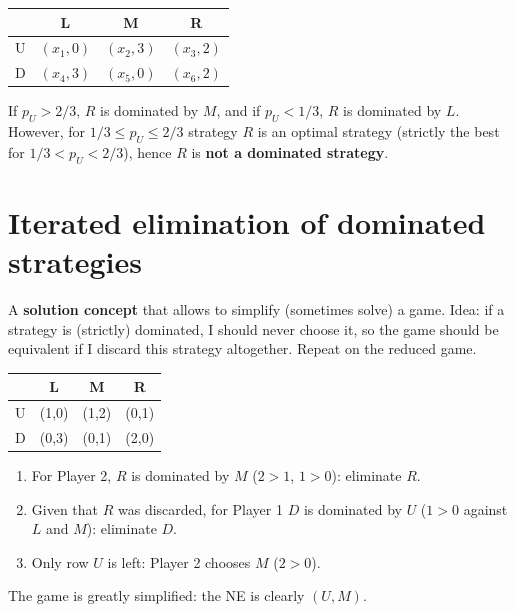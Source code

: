 \documentclass[11pt,a4paper,openany]{book}
\begin{document}
\begin{exbox}[title={Example 2: $R$ is not dominated}]
\begin{center}
\begin{tabular}{c|ccc}
 & L & M & R \\ \hline
U & $(x_1,0)$ & $(x_2,3)$ & $(x_3,2)$ \\
D & $(x_4,3)$ & $(x_5,0)$ & $(x_6,2)$
\end{tabular}
\end{center}
If $p_U > 2/3$, $R$ is dominated by $M$, and if $p_U < 1/3$, $R$ is dominated by $L$.
However, for $1/3 \le p_U \le 2/3$ strategy $R$ is an optimal strategy (strictly the best for
$1/3 < p_U < 2/3$), hence $R$ is \textbf{not a dominated strategy}.
\end{exbox}


\section{Iterated elimination of dominated strategies}

\begin{defnbox}[title=Iterated elimination of dominated strategies]
A \textbf{solution concept} that allows to simplify (sometimes solve) a game. Idea: if a
strategy is (strictly) dominated, I should never choose it, so the game should be
equivalent if I discard this strategy altogether. Repeat on the reduced game.
\end{defnbox}

\begin{exbox}[title=Solving a game by iterated elimination]
\begin{center}
\begin{tabular}{c|ccc}
 & L & M & R \\ \hline
U & (1,0) & (1,2) & (0,1) \\
D & (0,3) & (0,1) & (2,0)
\end{tabular}
\end{center}
\begin{enumerate}
  \item For Player 2, $R$ is dominated by $M$ ($2 > 1$, $1 > 0$): eliminate $R$.
  \item Given that $R$ was discarded, for Player 1 $D$ is dominated by $U$ ($1 > 0$ against
        $L$ and $M$): eliminate $D$.
  \item Only row $U$ is left: Player 2 chooses $M$ ($2 > 0$).
\end{enumerate}
The game is greatly simplified: the NE is clearly $(U, M)$.
\end{exbox}
\end{document}
